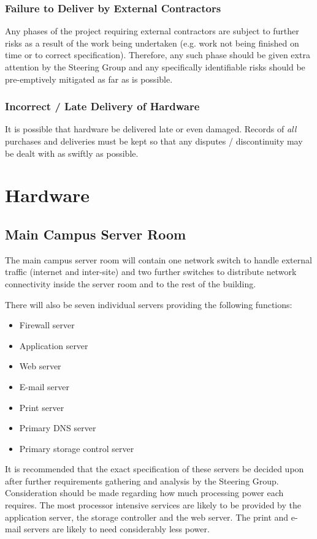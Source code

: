 \documentclass[a4paper, twoside]{article}
\begin{document}
\subsubsection{Failure to Deliver by External Contractors}
Any phases of the project requiring external contractors are subject to further
risks as a result of the work being undertaken (e.g. work not being finished on
time or to correct specification). Therefore, any such phase should be given
extra attention by the Steering Group and any specifically identifiable risks
should be pre-emptively mitigated as far as is possible.

\subsubsection{Incorrect / Late Delivery of Hardware}
It is possible that hardware be delivered late or even damaged. Records of
\emph{all} purchases and deliveries must be kept so that any
disputes / discontinuity may be dealt with as swiftly as possible.

\section{Hardware}
\subsection{Main Campus Server Room}
The main campus server room will contain one network switch to handle external
traffic (internet and inter-site) and two further switches to distribute network
connectivity inside the server room and to the rest of the building.

There will also be seven individual servers providing the following functions:
\begin{itemize}
\item{Firewall server}
\item{Application server}
\item{Web server}
\item{E-mail server}
\item{Print server}
\item{Primary DNS server}
\item{Primary storage control server}
\end{itemize}
It is recommended that the exact specification of these servers be decided upon
after further requirements gathering and analysis by the Steering Group.
Consideration should be made regarding how much processing power each requires.
The most processor intensive services are likely to be provided by the
application server, the storage controller and the web server. The print and
e-mail servers are likely to need considerably less power.
\end{document}
